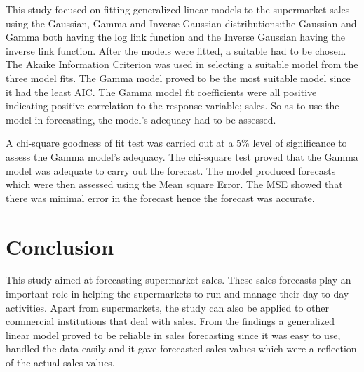 This study focused on fitting generalized linear models to the supermarket sales using the Gaussian, Gamma and Inverse Gaussian distributions;the Gaussian and Gamma both having the log link function and the Inverse Gaussian having the inverse link function. After the models were fitted, a suitable had to  be chosen. The Akaike Information Criterion was used in selecting a suitable model from the three model fits. The Gamma model proved to be the most suitable model since it had the least AIC.
The Gamma model fit coefficients were all positive indicating positive correlation to the response variable; sales. So as to use the model in forecasting, the model's adequacy had to be assessed.

A chi-square goodness of fit test was carried out at a 5\% level of significance to assess the Gamma model's adequacy. The chi-square test proved that the Gamma model was adequate to carry out the forecast. The model produced forecasts which were then assessed using the Mean square Error. The MSE showed that there was minimal error in the forecast hence the forecast was accurate.
\section{Conclusion}
This study aimed at forecasting supermarket sales. These sales forecasts play an important role in helping the supermarkets to run and manage their day to day activities. Apart from supermarkets, the study can also be applied to other commercial institutions that deal with sales. From the findings a generalized linear model proved to be reliable in sales forecasting since it was easy to use, handled the data easily and it gave forecasted sales values which were a reflection of the actual sales values.  
